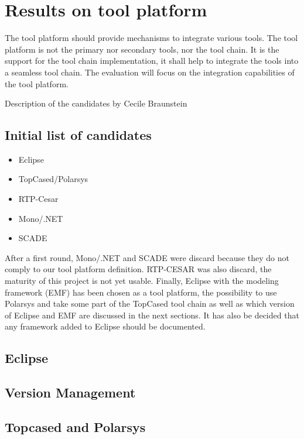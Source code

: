 
\chapter{Results on tool platform}
The tool platform should provide mechanisms to integrate various
tools. The tool platform is not the primary nor secondary tools, nor
the tool chain. It is the support for the tool chain implementation,
it shall help to integrate the tools into a seamless tool chain.
The evaluation will focus on the integration capabilities of the tool platform.
\begin{todo_comment}
Description of the candidates by Cecile Braunstein
\end{todo_comment}

\section{Initial list of candidates}
\begin{itemize}
\item  Eclipse 
\item  TopCased/Polarsys
\item RTP-Cesar
\item Mono/.NET 
\item SCADE
\end{itemize}

After a first round, Mono/.NET and  SCADE were discard because they do
not comply to our tool platform definition.
RTP-CESAR was also discard, the maturity of this project is not yet
usable. Finally, Eclipse with the modeling framework (EMF) has been chosen as a tool platform, the possibility
to use Polarsys and take some part of the TopCased tool chain as well
as which version of Eclipse and EMF are
discussed in the next sections.
It has also be decided that any framework added to Eclipse should be
documented.

\section{Eclipse}

\section{Version Management}

\section{Topcased and Polarsys}

